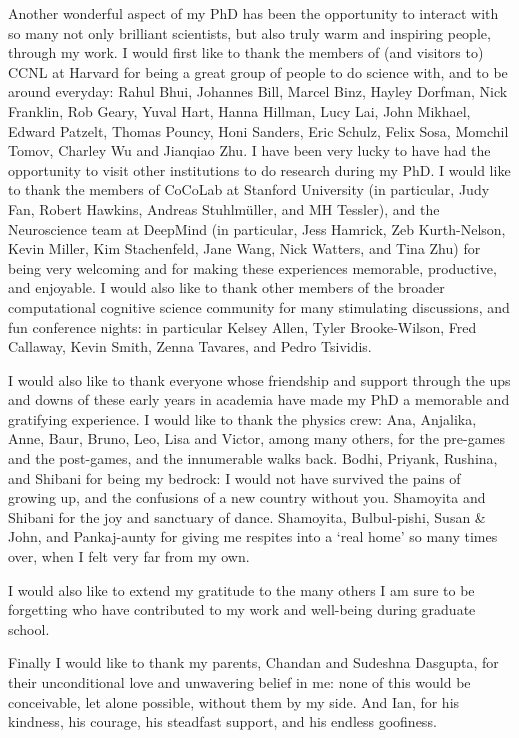 Another wonderful aspect of my PhD has been the opportunity to interact with so many not only brilliant scientists, but also truly warm and inspiring people, through my work. I would first like to thank the members of (and visitors to) CCNL at Harvard for being a great group of people to do science with, and to be around everyday: Rahul Bhui, Johannes Bill, Marcel Binz, Hayley Dorfman, Nick Franklin, Rob Geary, Yuval Hart, Hanna Hillman, Lucy Lai, John Mikhael, Edward Patzelt, Thomas Pouncy, Honi Sanders, Eric Schulz, Felix Sosa,  Momchil Tomov, Charley Wu and Jianqiao Zhu. I have been very lucky to have had the opportunity to visit other institutions to do research during my PhD. I would like to thank the members of CoCoLab at Stanford University (in particular, Judy Fan, Robert Hawkins, Andreas Stuhlmüller, and MH Tessler), and the Neuroscience team at DeepMind (in particular, Jess Hamrick, Zeb Kurth-Nelson, Kevin Miller, Kim Stachenfeld, Jane Wang, Nick Watters, and Tina Zhu) for being very welcoming and for making these experiences memorable, productive, and enjoyable. I would also like to thank other members of the broader computational cognitive science community for many stimulating discussions, and fun conference nights: in particular Kelsey Allen, Tyler Brooke-Wilson, Fred Callaway, Kevin Smith, Zenna Tavares, and Pedro Tsividis.

I would also like to thank everyone whose friendship and support through the ups and downs of these early years in academia have made my PhD a memorable and gratifying experience. I would like to thank the physics crew: Ana, Anjalika, Anne, Baur, Bruno, Leo, Lisa and Victor, among many others, for the pre-games and the post-games, and the innumerable walks back. Bodhi, Priyank, Rushina, and Shibani for being my bedrock: I would not have survived the pains of growing up, and the confusions of a new country without you. Shamoyita and Shibani for the joy and sanctuary of dance. Shamoyita, Bulbul-pishi, Susan \& John, and Pankaj-aunty for giving me respites into a `real home' so many times over, when I felt very far from my own.

I would also like to extend my gratitude to the many others I am sure to be forgetting who have contributed to my work and well-being during graduate school.


Finally I would like to thank my parents, Chandan and Sudeshna Dasgupta, for their unconditional love and unwavering belief in me: none of this would be conceivable, let alone possible, without them by my side. And Ian, for his kindness, his courage, his steadfast support, and his endless goofiness.

%
%
%
%
%
%
%
%



